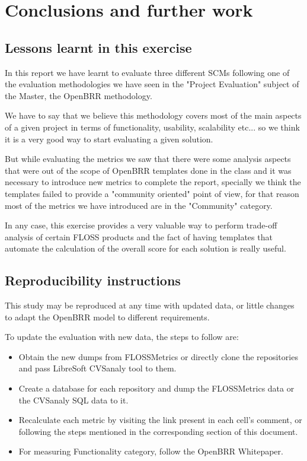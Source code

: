 \documentclass[a4paper,10pt]{article}
\begin{document}
\section{Conclusions and further work}

\subsection{Lessons learnt in this exercise}

In this report we have learnt to evaluate three different SCMs following one of the evaluation methodologies we have seen in the "Project Evaluation" subject of the Master, the OpenBRR methodology.

We have to say that we believe this methodology covers most of the main aspects of a given project in terms of functionality, usability, scalability etc... so we think it is a very good way to start evaluating a given solution.

But while evaluating the metrics we saw that there were some analysis aspects
that were out of the scope of OpenBRR templates done in the class and it was
necessary to introduce new metrics to complete the report, specially we think
the templates failed to provide a "community oriented" point of view, for that
reason most of the metrics we have introduced are in the "Community" category.

In any case, this exercise provides a very valuable way to perform trade-off analysis of certain FLOSS products and the fact of having templates that automate the calculation of the overall score for each solution is really useful.

\subsection{Reproducibility instructions}
This study may be reproduced at any time with updated data, or little changes
to adapt the OpenBRR model to different requirements. 

To update the evaluation with new data, the steps to follow are:
\begin{itemize}
 \item Obtain the new dumps from FLOSSMetrics or directly clone the
repositories and pass LibreSoft CVSanaly tool to them.
\item Create a database for each repository and dump the FLOSSMetrics data or
the CVSanaly SQL data to it.
\item Recalculate each metric by visiting the link present in each cell's
comment, or following the steps mentioned in the corresponding section of this
document.
\item For measuring Functionality category, follow the OpenBRR
Whitepaper\cite{OpenBRRWhitepaper}.
\end{itemize}
\end{document}
